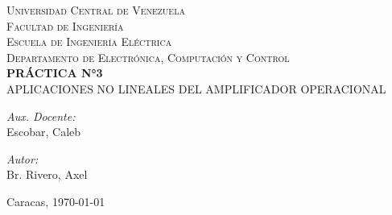 
\begin{titlepage}
    \begin{center}
        \textsc{\large Universidad Central de Venezuela}\\
        \textsc{\large Facultad de Ingeniería}\\
        \textsc{\large Escuela de Ingeniería Eléctrica}\\
        \textsc{\large Departamento de Electrónica, Computación y Control}\\[7cm]
        
        {\huge \bfseries PRÁCTICA N°3}\\[0.2cm]
        {\Large APLICACIONES NO LINEALES DEL AMPLIFICADOR OPERACIONAL}\\[10cm]
        
        \begin{minipage}{0.4\textwidth}
            \begin{flushleft}
                \emph{Aux. Docente:}\\
                Escobar, Caleb 
            \end{flushleft}
        \end{minipage}
        \begin{minipage}{0.4\textwidth}
            \begin{flushright}
                \emph{Autor:}\\
                Br. Rivero, Axel
            \end{flushright}
        \end{minipage}
        
        \vfill
        
        {\large Caracas, \today} %
        
    \end{center}
\end{titlepage}
